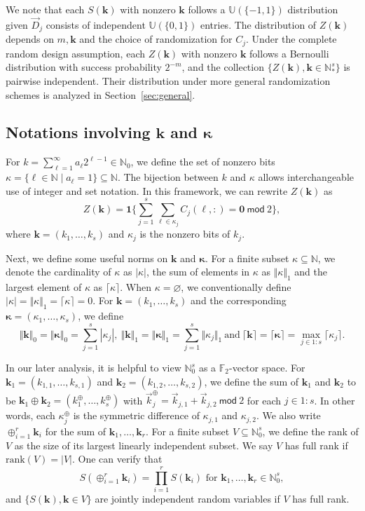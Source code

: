 \documentclass{article}
\theoremstyle{definition}
\renewcommand{\emptyset}{\varnothing}
\newcommand{\tmod}{\ \mathsf{mod}\ }
\newcommand{\natu}{\mathbb{N}}
\newcommand{\bsk}{\boldsymbol{k}}
\newcommand{\bszero}{\boldsymbol{0}}
\newcommand{\bsone}{\boldsymbol{1}}
\newcommand{\bskappa}{\boldsymbol{\kappa}}
\newcommand{\dunif}{\mathbb{U}}
\newcommand{\rank}{\mathrm{rank}}
\begin{document}
We note that each $S(\bsk)$ with nonzero $\bsk$ follows a $\dunif(\{-1,1\})$ distribution given $\vec{D}_j$ consists of independent $\dunif(\{0,1\})$ entries. The distribution of $Z(\bsk)$ depends on $m,\bsk$ and the choice of randomization for $C_j$. Under the complete random design assumption, each $Z(\bsk)$ with nonzero $\bsk$ follows a Bernoulli distribution with success probability $2^{-m}$, and the collection $\{Z(\bsk),\bsk\in \natu^s_*\}$ is pairwise independent. Their distribution under more general randomization schemes is analyzed in Section~\ref{sec:general}.

\subsection{Notations involving $\bsk$ and $\bskappa$}\label{subset:kandkappa}
For $k = \sum_{\ell=1}^\infty a_\ell 2^{\ell-1}\in \natu_0$, we define the set of nonzero bits $\kappa = \{\ell\in \natu\mid a_\ell=1\}\subseteq\natu$. The bijection between $k$ and $\kappa$ allows interchangeable use of integer and set notation. In this framework, we can rewrite $Z(\bsk)$ as
\begin{equation}\label{eqn:Zk}
Z(\bsk)=\bsone\Big\{\sum_{j=1}^s \sum_{\ell\in \kappa_j}  C_j(\ell,:)=\bszero \tmod 2\Big\},    
\end{equation}
where $\bsk=(k_1,\dots,k_s)$ and $\kappa_j$ is the nonzero bits of $k_j$.

Next, we define some useful norms on $\bsk$ and $\bskappa$. For a finite subset $\kappa\subseteq \natu$, we denote the cardinality of $\kappa$ as $|\kappa|$, the sum of elements in $\kappa$ as $\Vert\kappa\Vert_1$ and the largest element of $\kappa$ as $\lceil\kappa\rceil$. When $\kappa=\emptyset$, we conventionally define $|\kappa|=\Vert\kappa\Vert_1=\lceil\kappa\rceil=0$. For $\bsk=(k_1,\dots,k_s)$ and the corresponding $\bskappa=(\kappa_1,\dots,\kappa_s)$, we define
$$
\Vert\bsk\Vert_0=\Vert\bskappa\Vert_0=\sum_{j=1}^s|\kappa_j|,
\
\Vert\bsk\Vert_1=\Vert\bskappa\Vert_1 = \sum_{j=1}^s\Vert\kappa_j\Vert_1
\ \text{and}\
\lceil\bsk\rceil=\lceil\bskappa\rceil=\max_{j\in 1{:}s}\lceil\kappa_j\rceil.
$$

In our later analysis, it is helpful to view $\natu^s_0$ as a $\mathbb{F}_2$-vector space. For $\bsk_1=(k_{1,1},\dots,k_{s,1})$ and $\bsk_2=(k_{1,2},\dots,k_{s,2})$, we define the sum of $\bsk_1$ and $\bsk_2$ to be $\bsk_1\oplus\bsk_2=(k^\oplus_1,\dots,k^\oplus_s)$ with $\vec{k}^\oplus_j=\vec{k}_{j,1}+\vec{k}_{j,2} \tmod 2$ for each $j\in 1{:}s$. In other words, each $\kappa^\oplus_j$ is the symmetric difference of $\kappa_{j,1}$ and $\kappa_{j,2}$. We also write $\oplus_{i=1}^r\bsk_i$ for the sum of $\bsk_1, \dots, \bsk_r$. For a finite subset $V\subseteq \natu^s_0$, we define the rank of $V$ as the size of its largest linearly independent subset. We say $V$ has full rank if $\rank(V)=|V|$. One can verify that
$$S(\oplus_{i=1}^r\bsk_i)=\prod_{i=1}^rS(\bsk_i) \text{ for } \bsk_1,\dots,\bsk_r\in \natu^s_0,$$
and $\{S(\bsk),\bsk\in V\}$ are jointly independent random variables if $V$ has full rank.
\end{document}
